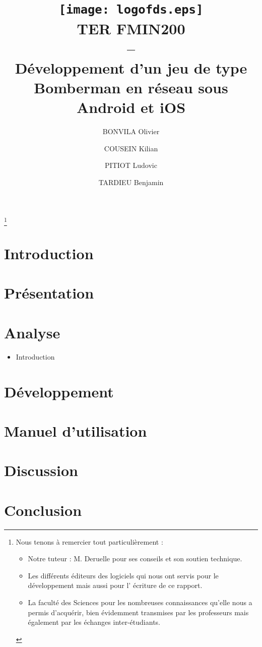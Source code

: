 \documentclass[a4paper,11pt]{report}
\title{
	\texttt{[image: logofds.eps]}\\
	\vspace*{1cm}
	TER FMIN200 \\ 
	-- \\
	Développement d'un jeu de type Bomberman en réseau sous Android et iOS
}
\author{BONVILA Olivier \and COUSEIN Kilian \and PITIOT Ludovic \and TARDIEU Benjamin}
\date{}
\begin{document}
\maketitle

\thanks{

  Nous tenons à remercier tout particulièrement :
\begin{itemize}
	\item{Notre tuteur : M. Deruelle pour ses conseils et son soutien technique.}
	\item{Les différents  éditeurs des logiciels qui nous ont servis pour le développement mais aussi pour l’ écriture de ce rapport.}
	\item{La faculté des Sciences pour les nombreuses connaissances qu’elle nous a permis d’acquérir, bien évidemment transmises par les professeurs mais également par les échanges inter-étudiants.}
\end{itemize}

}

\tableofcontents


\chapter{Introduction}

	

\chapter{Présentation}

	
	
	
\chapter{Analyse}
	\begin{itemize}
		\item{Introduction}
	\end{itemize}
	
	
	


\chapter{Développement}

	
	
		
		
		
\chapter{Manuel d'utilisation}

	

	

\chapter{Discussion}

	

	
			
\chapter{Conclusion}

	
   


\printglossaries
\end{document}
